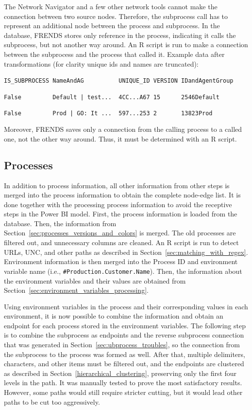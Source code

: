 \documentclass[english, 12pt, a4paper, sci, utf8, a-2b, online, obeyspaces]{aaltothesis}
\begin{document}
The Network Navigator and a few other network tools cannot make the connection between two source nodes. Therefore, the subprocess call has to represent an additional node between the process and subprocess. In the database, FRENDS stores only reference in the process, indicating it calls the subprocess, but not another way around. An R script is run to make a connection between the subprocess and the process that called it. Example data after transformations (for clarity unique ids and names are truncated):

\nopagebreak
\verb=IS_SUBPROCESS NameAndAG          UNIQUE_ID VERSION IDandAgentGroup=

\nopagebreak
\verb=False         Default | test...  4CC...A67 15      2546Default=

\nopagebreak
\verb=False         Prod | GO: It ...  597...253 2       13823Prod=

Moreover, FRENDS saves only a connection from the calling process to a called one, not the other way around. Thus, it must be determined with an R script.

\subsection{Processes}
\label{sec:processes}
In addition to process information, all other information from other steps is merged into the process information to obtain the complete node-edge list. It is done together with the processing process information to avoid the receptive steps in the Power BI model. First, the process information is loaded from the database. Then, the information from Section~\ref{sec:processes_versions_and_colors} is merged.  The old processes are filtered out, and unnecessary columns are cleaned. An R script is run to detect URLs, UNC, and other paths as described in Section~\ref{sec:matching_with_regex}. Environment information is then merged into the Process ID and environment variable name (i.e., \verb|#Production.Customer.Name|). Then, the information about the environment variables and their values are obtained from Section~\ref{sec:environment_variables_processing}. 

Using environment variables in the process and their corresponding values in each environment, it is now possible to combine the information and obtain an endpoint for each process stored in the environment variables. The following step is to combine the subprocess as endpoints and the reverse subprocess connection that was generated in Section~\ref{sec:ubprocess_troubles}, so the connection from the subprocess to the process was formed as well. After that, multiple delimiters, characters, and other items must be filtered out, and the endpoints are clustered as described in Section~\ref{hierarchical_clustering}, preserving only the first four levels in the path. It was manually tested to prove the most satisfactory results. However, some paths would still require stricter cutting, but it would lead other paths to be cut too aggressively. 
\end{document}
